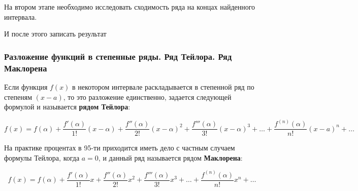 \documentclass{article}
\begin{document}
\hfill

На втором этапе необходимо исследовать сходимость ряда на концах найденного интервала.

И после этого записать результат

\subsubsection{Разложение функций в степенные ряды. Ряд Тейлора. Ряд Маклорена}

Если функция $f(x)$ в некотором интервале раскладывается в степенной ряд по степеням $(x - a)$, то это разложение единственно, задается следующей формулой и называется \textbf{рядом Тейлора}:

$$
f(x) = f(\alpha) + \frac{f'(\alpha)}{1!} (x - \alpha) + \frac{f''(\alpha)}{2!} (x - \alpha)^2 + \frac{f'''(\alpha)}{3!} (x - \alpha)^3 + \dots + \frac{f^{(n)}(\alpha)}{n!} (x - a)^{n} + \dots
$$

На практике процентах в 95-ти приходится иметь дело с частным случаем формулы Тейлора, когда $a = 0$, и данный ряд называется рядом \textbf{Маклорена}:

$$
f(x) = f(\alpha) + \frac{f'(\alpha)}{1!} x + \frac{f''(\alpha)}{2!} x^2 + \frac{f'''(\alpha)}{3!} x^3 + \dots + \frac{f^{(n)}(\alpha)}{n!} x^{n} + \dots
$$
\end{document}
